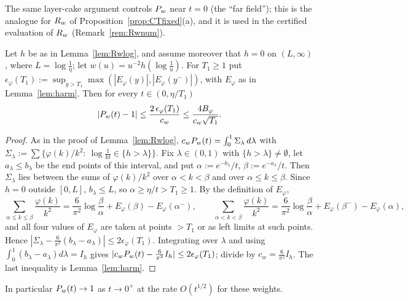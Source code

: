 The same layer-cake argument controls $P_w$ near $t=0$ (the ``far field''); this is the analogue for $R_w$ of
Proposition~\ref{prop:CTfixed}(a), and it is used in the certified evaluation of $R_w$ (Remark~\ref{rem:Rwnum}).

\begin{lemma}\label{lem:Rwfar}
Let $h$ be as in Lemma~\ref{lem:Rwlog}, and assume moreover that $h=0$ on $(L,\infty)$, where $L=\log\frac1\eta$; let
$w(u)=u^{-2}h(\log\frac1u)$. For $T_1\ge1$ put $\epsilon_\varphi(T_1):=\sup_{y>T_1}\max(|E_\varphi(y)|,|E_\varphi(y^-)|)$,
with $E_\varphi$ as in Lemma~\ref{lem:harm}. Then for every $t\in(0,\eta/T_1)$
\[
 |P_w(t)-1|\le\frac{2\,\epsilon_\varphi(T_1)}{c_w}\le\frac{4B_\varphi}{c_w\sqrt{T_1}} .
\]
\end{lemma}

\begin{proof}
As in the proof of Lemma~\ref{lem:Rwlog}, $c_wP_w(t)=\int_0^1\Sigma_\lambda\,d\lambda$ with
$\Sigma_\lambda:=\sum\{\varphi(k)/k^2:\ \log\frac1{kt}\in\{h>\lambda\}\}$. Fix $\lambda\in(0,1)$ with $\{h>\lambda\}\ne\emptyset$, let
$a_\lambda\le b_\lambda$ be the end points of this interval, and put $\alpha:=e^{-b_\lambda}/t$, $\beta:=e^{-a_\lambda}/t$. Then
$\Sigma_\lambda$ lies between the sums of $\varphi(k)/k^2$ over $\alpha<k<\beta$ and over $\alpha\le k\le\beta$. Since $h=0$ outside $[0,L]$,
$b_\lambda\le L$, so $\alpha\ge\eta/t>T_1\ge1$. By the definition of $E_\varphi$,
\[
 \sum_{\alpha\le k\le\beta}\frac{\varphi(k)}{k^2}=\frac6{\pi^2}\log\frac\beta\alpha+E_\varphi(\beta)-E_\varphi(\alpha^-),\qquad
 \sum_{\alpha<k<\beta}\frac{\varphi(k)}{k^2}=\frac6{\pi^2}\log\frac\beta\alpha+E_\varphi(\beta^-)-E_\varphi(\alpha),
\]
and all four values of $E_\varphi$ are taken at points $>T_1$ or as left limits at such points. Hence
$|\Sigma_\lambda-\frac6{\pi^2}(b_\lambda-a_\lambda)|\le2\epsilon_\varphi(T_1)$. Integrating over $\lambda$ and using
$\int_0^1(b_\lambda-a_\lambda)d\lambda=I_h$ gives $|c_wP_w(t)-\frac6{\pi^2}I_h|\le2\epsilon_\varphi(T_1)$; divide by $c_w=\frac6{\pi^2}I_h$. The
last inequality is Lemma~\ref{lem:harm}.
\end{proof}

In particular $P_w(t)\to1$ as $t\to0^+$ at the rate $O(t^{1/2})$ for these weights.

